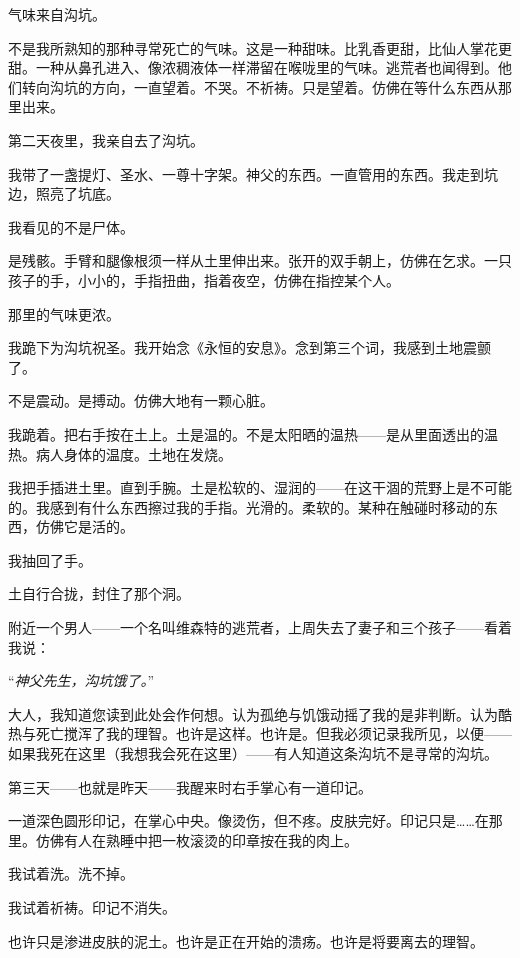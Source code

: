 \noindent 气味来自沟坑。

\noindent 不是我所熟知的那种寻常死亡的气味。这是一种甜味。比乳香更甜，比仙人掌花更甜。一种从鼻孔进入、像浓稠液体一样滞留在喉咙里的气味。逃荒者也闻得到。他们转向沟坑的方向，一直望着。不哭。不祈祷。只是望着。仿佛在等什么东西从那里出来。

\noindent 第二天夜里，我亲自去了沟坑。

\noindent 我带了一盏提灯、圣水、一尊十字架。神父的东西。一直管用的东西。我走到坑边，照亮了坑底。

\noindent 我看见的不是尸体。

\noindent 是残骸。手臂和腿像根须一样从土里伸出来。张开的双手朝上，仿佛在乞求。一只孩子的手，小小的，手指扭曲，指着夜空，仿佛在指控某个人。

\noindent 那里的气味更浓。

\noindent 我跪下为沟坑祝圣。我开始念《永恒的安息》。念到第三个词，我感到土地震颤了。

\noindent 不是震动。是搏动。仿佛大地有一颗心脏。

\noindent 我跪着。把右手按在土上。土是温的。不是太阳晒的温热——是从里面透出的温热。病人身体的温度。土地在发烧。

\noindent 我把手插进土里。直到手腕。土是松软的、湿润的——在这干涸的荒野上是不可能的。我感到有什么东西擦过我的手指。光滑的。柔软的。某种在触碰时移动的东西，仿佛它是活的。

\noindent 我抽回了手。

\noindent 土自行合拢，封住了那个洞。

\noindent 附近一个男人——一个名叫维森特的逃荒者，上周失去了妻子和三个孩子——看着我说：

\noindent \textquotedblleft{\textit{神父先生，沟坑饿了。}\textquotedblright{}}

\noindent 大人，我知道您读到此处会作何想。认为孤绝与饥饿动摇了我的是非判断。认为酷热与死亡搅浑了我的理智。也许是这样。也许是。但我必须记录我所见，以便——如果我死在这里（我想我会死在这里）——有人知道这条沟坑不是寻常的沟坑。

\noindent 第三天——也就是昨天——我醒来时右手掌心有一道印记。

\noindent 一道深色圆形印记，在掌心中央。像烫伤，但不疼。皮肤完好。印记只是……在那里。仿佛有人在熟睡中把一枚滚烫的印章按在我的肉上。

\noindent 我试着洗。洗不掉。

\noindent 我试着祈祷。印记不消失。

\noindent 也许只是渗进皮肤的泥土。也许是正在开始的溃疡。也许是将要离去的理智。

